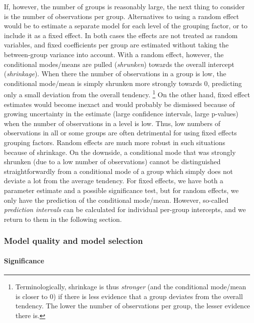 If, however, the number of groups is reasonably large, the next thing to consider is the number of observations per group.
Alternatives to using a random effect would be to estimate a separate model for each level of the grouping factor, or to include it as a fixed effect.
In both cases the effects are not treated as random variables, and fixed coefficients per group are estimated without taking the between-group variance into account.
With a random effect, however, the conditional modes\slash means are pulled (\textit{shrunken}) towards the overall intercept (\textit{shrinkage}).
When there the number of observations in a group is low, the conditional mode\slash mean is simply shrunken more strongly towards $0$, predicting only a small deviation from the overall tendency.%
\footnote{Terminologically, shrinkage is thus \textit{stronger} (and the conditional mode\slash mean is closer to $0$) if there is less evidence that a group deviates from the overall tendency.
The lower the number of observations per group, the lesser evidence there is.}
On the other hand, fixed effect estimates would become inexact and would probably be dismissed because of growing uncertainty in the estimate (large confidence intervals, large p-values) when the number of observations in a level is low.
Thus, low numbers of observations in all or some groups are often detrimental for using fixed effects grouping factors.
Random effects are much more robust in such situations because of shrinkage.
On the downside, a conditional mode that was strongly shrunken (due to a low number of observations) cannot be distinguished straightforwardly from a conditional mode of a group which simply does not deviate a lot from the average tendency.
For fixed effects, we have both a parameter estimate and a possible significance test, but for random effects, we only have the prediction of the conditional mode\slash mean.
However, so-called \textit{prediction intervals} can be calculated for individual per-group intercepts, and we return to them in the following section.


\subsubsection{Model quality and model selection}
\label{sec:significancetestingandcoefficientsofdetermination}

\paragraph{Significance}

